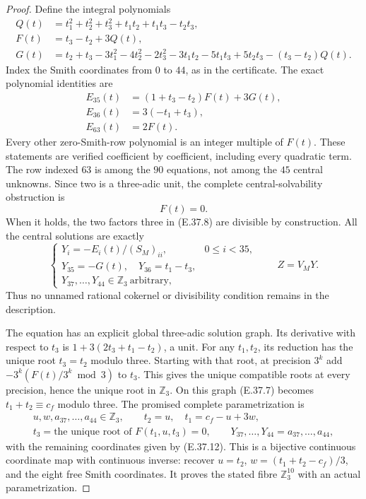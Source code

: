 \begin{proof}
Define the integral polynomials
\[
 \begin{split}
 Q(t)&=t_1^2+t_2^2+t_3^2+t_1t_2+t_1t_3-t_2t_3,\\
 F(t)&=t_3-t_2+3Q(t),\\
 G(t)&=t_2+t_3-3t_1^2-4t_2^2-2t_3^2
       -3t_1t_2-5t_1t_3+5t_2t_3
       -(t_3-t_2)Q(t).
 \end{split}
 \tag{E.37.9}
\]
Index the Smith coordinates from $0$ to $44$,
as in the certificate.  The exact polynomial
identities are
\[
 \begin{split}
 E_{35}(t)&=(1+t_3-t_2)F(t)+3G(t),\\
 E_{36}(t)&=3(-t_1+t_3),\\
 E_{63}(t)&=2F(t).
 \end{split}
 \tag{E.37.10}
\]
Every other zero-Smith-row polynomial is an
integer multiple of $F(t)$.
These statements are verified coefficient by
coefficient, including every quadratic term.
The row indexed $63$ is among the $90$ equations,
not among the $45$ central unknowns.
Since two is a three-adic unit,
the complete central-solvability obstruction is
\[
                           F(t)=0.
 \tag{E.37.11}
\]
When it holds, the two factors three in
\textup{(E.37.8)} are divisible by construction.
All the central solutions are exactly
\[
 \begin{cases}
 Y_i=-E_i(t)/(S_M)_{ii},&0\le i<35,\\
 Y_{35}=-G(t),\quad Y_{36}=t_1-t_3,\\
 Y_{37},\ldots,Y_{44}\in\mathbb Z_3\ \text{arbitrary},
 \end{cases}
 \qquad Z=V_MY .
 \tag{E.37.12}
\]
Thus no unnamed rational cokernel or divisibility
condition remains in the description.

The equation has an explicit global three-adic
solution graph.  Its derivative with respect
to $t_3$ is $1+3(2t_3+t_1-t_2)$, a unit.
For any $t_1,t_2$, its reduction has the unique
root $t_3=t_2$ modulo three.
Starting with that root, at precision $3^k$
add
$-3^k(F(t)/3^k\bmod3)$ to $t_3$.
This gives the unique compatible roots at every
precision, hence the unique root in $\mathbb Z_3$.
On this graph \textup{(E.37.7)} becomes
$t_1+t_2\equiv c_f$ modulo three.
The promised complete parametrization is
\[
 \begin{gathered}
 u,w,a_{37},\ldots,a_{44}\in\mathbb Z_3,\qquad
 t_2=u,\quad t_1=c_f-u+3w,\\
 t_3=\text{the unique root of }F(t_1,u,t_3)=0,\qquad
 Y_{37},\ldots,Y_{44}=a_{37},\ldots,a_{44},
 \end{gathered}
 \tag{E.37.13}
\]
with the remaining coordinates given by
\textup{(E.37.12)}.
This is a bijective continuous coordinate map
with continuous inverse: recover $u=t_2$,
$w=(t_1+t_2-c_f)/3$, and the eight free Smith
coordinates.  It proves the stated fibre
$\mathbb Z_3^{10}$ with an actual parametrization.


\end{proof}

